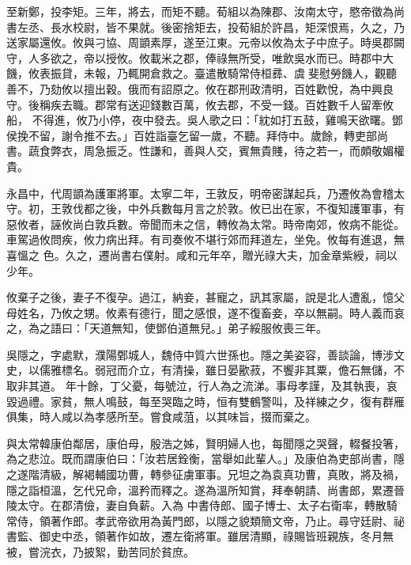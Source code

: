 \begin{pinyinscope}
 至新鄭，投李矩。三年，將去，而矩不聽。荀組以為陳郡、汝南太守，愍帝徵為尚書左丞、長水校尉，皆不果就。後密捨矩去，投荀組於許昌，矩深恨焉，久之，乃送家屬還攸。攸與刁協、周顗素厚，遂至江東。元帝以攸為太子中庶子。時吳郡闕守，人多欲之，帝以授攸。攸載米之郡，俸祿無所受，唯飲吳水而已。時郡中大饑，攸表振貸，未報，乃輒開倉救之。臺遣散騎常侍桓彞、虞斐慰勞饑人，觀聽善不，乃劾攸以擅出穀。俄而有詔原之。攸在郡刑政清明，百姓歡悅，為中興良守。後稱疾去職。郡常有送迎錢數百萬，攸去郡，不受一錢。百姓數千人留牽攸船，
 不得進，攸乃小停，夜中發去。吳人歌之曰：「紞如打五鼓，雞鳴天欲曙。鄧侯挽不留，謝令推不去。」百姓詣臺乞留一歲，不聽。拜侍中。歲餘，轉吏部尚書。蔬食弊衣，周急振乏。性謙和，善與人交，賓無貴賤，待之若一，而頗敬媚權貴。



 永昌中，代周顗為護軍將軍。太寧二年，王敦反，明帝密謀起兵，乃遷攸為會稽太守。初，王敦伐都之後，中外兵數每月言之於敦。攸已出在家，不復知護軍事，有惡攸者，誣攸尚白敦兵數。帝聞而未之信，轉攸為太常。時帝南郊，攸病不能從。車駕過攸問疾，攸力病出拜。有司奏攸不堪行郊而拜道左，坐免。攸每有進退，無喜慍之
 色。久之，遷尚書右僕射。咸和元年卒，贈光祿大夫，加金章紫綬，祠以少年。



 攸棄子之後，妻子不復孕。過江，納妾，甚寵之，訊其家屬，說是北人遭亂，憶父母姓名，乃攸之甥。攸素有德行，聞之感恨，遂不復畜妾，卒以無嗣。時人義而哀之，為之語曰：「天道無知，使鄧伯道無兒。」弟子綏服攸喪三年。



 吳隱之，字處默，濮陽鄄城人，魏侍中質六世孫也。隱之美姿容，善談論，博涉文史，以儒雅標名。弱冠而介立，有清操，雖日晏歠菽，不饗非其粟，儋石無儲，不取非其道。
 年十餘，丁父憂，每號泣，行人為之流涕。事母孝謹，及其執喪，哀毀過禮。家貧，無人鳴鼓，每至哭臨之時，恒有雙鶴警叫，及祥練之夕，復有群雁俱集，時人咸以為孝感所至。嘗食咸菹，以其味旨，掇而棄之。



 與太常韓康伯鄰居，康伯母，殷浩之姊，賢明婦人也，每聞隱之哭聲，輟餐投箸，為之悲泣。既而謂康伯曰：「汝若居銓衡，當舉如此輩人。」及康伯為吏部尚書，隱之遂階清級，解褐輔國功曹，轉參征虜軍事。兄坦之為袁真功曹，真敗，將及禍，隱之詣桓溫，乞代兄命，溫矜而釋之。遂為溫所知賞，拜奉朝請、尚書郎，累遷晉陵太守。在郡清儉，妻自負薪。入為
 中書侍郎、國子博士、太子右衛率，轉散騎常侍，領著作郎。孝武帝欲用為黃門郎，以隱之貌類簡文帝，乃止。尋守廷尉、祕書監、御史中丞，領著作如故，遷左衛將軍。雖居清顯，祿賜皆班親族，冬月無被，嘗浣衣，乃披絮，勤苦同於貧庶。




\end{pinyinscope}

